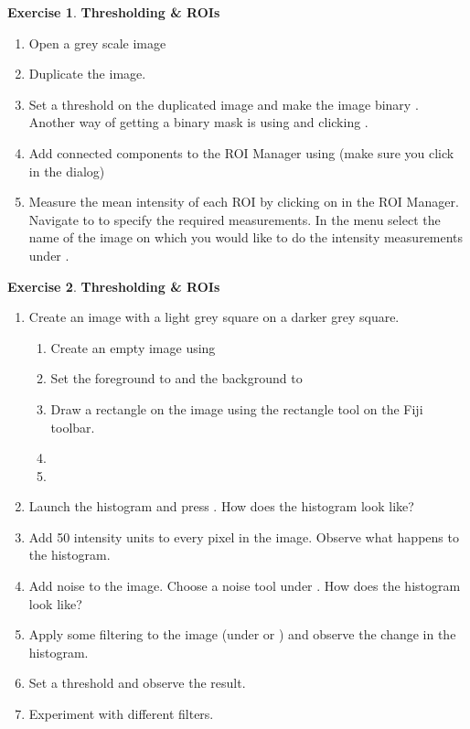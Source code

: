 \documentclass[xcolor=table,DIV=19,twocolumn]{scrartcl}
\theoremstyle{definition}
\newtheorem{exercice}{Exercise}
\begin{document}
\begin{exercice} \textbf{Thresholding \& ROIs}
  \begin{enumerate}
  \item Open a grey scale image
  \item Duplicate the image.
  \item Set a threshold on the duplicated image and make the image binary . Another way of getting a binary mask is using  and clicking .
  \item Add connected components to the ROI Manager using  (make sure you click  in the  dialog)
  \item Measure the mean intensity of each ROI by clicking on  in the ROI Manager. Navigate to  to specify the required measurements. In the  menu select the name of the image on which you would like to do the intensity measurements under .

  \end{enumerate}
\end{exercice}

\begin{exercice} \textbf{Thresholding \& ROIs}
  \begin{enumerate}
     \item Create an image with a light grey square on a darker grey
      square.
      \begin{enumerate}
          \item Create an empty image using 
          \item {} Set the foreground to  and the background to 
          \item Draw a rectangle on the image using the rectangle tool on the Fiji toolbar.
          \item {}
          \item {}
        \end{enumerate}
      \item Launch the histogram and press . How does the histogram look like?
      \item Add 50 intensity units to every pixel in the image.   Observe what happens to the histogram.
      \item Add noise to the image. Choose a noise tool under   . How does the histogram look like?
    \item Apply some filtering to the image (under  or ) and observe the change in the histogram.
    \item Set a threshold and observe the result.
    \item  Experiment with different filters.
  \end{enumerate}
\end{exercice}
\end{document}
